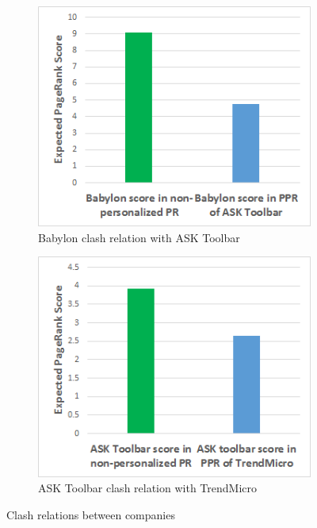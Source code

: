 \documentclass[11pt,oneside]{book}
\begin{document}
\begin{figure}[!htbp]
\centering
\begin{subfigure}[b]{0.8\textwidth}
	\centering
\includegraphics[scale=0.8]{figures/babylon_clash_ask.png}
\caption{Babylon clash relation with ASK Toolbar}
\label{fig:babylon_clash_ask}
\end{subfigure}
\begin{subfigure}[b]{0.8\textwidth}
	\centering
\includegraphics[scale=0.8]{figures/ask_clash_trend.png}
\caption{ASK Toolbar clash relation with TrendMicro}
\label{fig:ask_clash_trend}
\end{subfigure}
\caption{Clash relations between companies}
	\label{fig:clash_1}
\end{figure}
\end{document}
